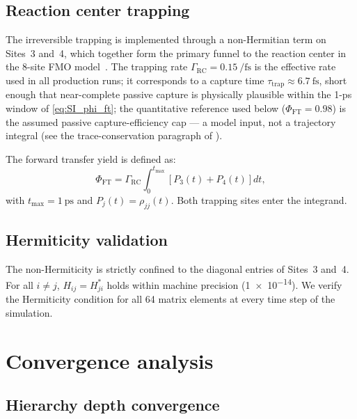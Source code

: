 \documentclass[11pt,a4paper]{article}
\begin{document}
\subsection{Reaction center trapping}

The irreversible trapping is implemented through a non-Hermitian term on Sites~3 and~4, which together form the primary funnel to the reaction center in the 8-site FMO model~\cite{Renger2003,Moix2011}. The trapping rate $\Gamma_{\mathrm{RC}} = \qty{0.15}{\per\fs}$ is the effective rate used in all production runs; it corresponds to a capture time $\tau_{\mathrm{trap}} \approx \qty{6.7}{\fs}$, short enough that near-complete passive capture is physically plausible within the 1-ps window of \cref{eq:SI_phi_ft}; the quantitative reference used below ($\Phi_{\mathrm{FT}} = 0.98$) is the assumed passive capture-efficiency cap --- a model input, not a trajectory integral (see the trace-conservation paragraph of ).

The forward transfer yield is defined as:
\begin{equation}\label{eq:SI_phi_ft}
\Phi_{\mathrm{FT}} = \Gamma_{\mathrm{RC}} \int_0^{t_{\mathrm{max}}} \left[ P_3(t) + P_4(t) \right] dt,
\end{equation}
with $t_{\mathrm{max}} = \qty{1}{\ps}$ and $P_j(t) = \rho_{jj}(t)$. Both trapping sites enter the integrand.

\subsection{Hermiticity validation}

The non-Hermiticity is strictly confined to the diagonal entries of Sites~3 and~4. For all $i \neq j$, $H_{ij} = H_{ji}^*$ holds within machine precision (\num{1e-14}). We verify the Hermiticity condition for all 64 matrix elements at every time step of the simulation.


\section{Convergence analysis}
\label{SI-sec:convergence}

\subsection{Hierarchy depth convergence}
\end{document}
